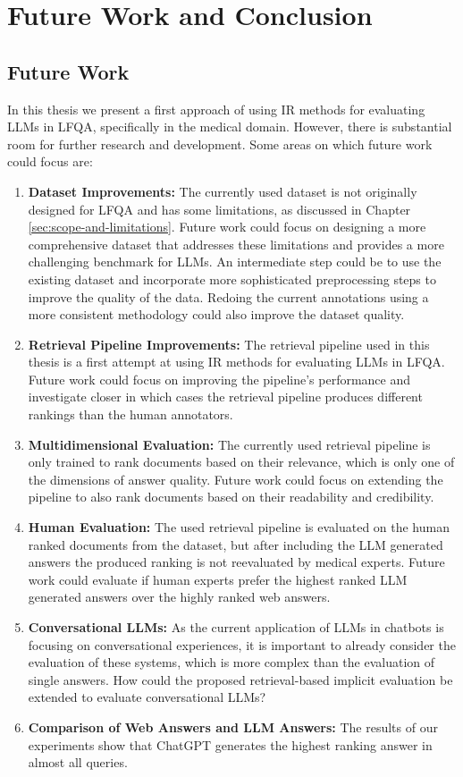 \chapter{Future Work and Conclusion}\label{conclusion}

\section{Future Work}
In this thesis we present a first approach of using IR methods for evaluating LLMs in LFQA, specifically in the medical domain.
However, there is substantial room for further research and development.
Some areas on which future work could focus are:

\begin{enumerate}
    \item \textbf{Dataset Improvements:} The currently used dataset is not originally designed for LFQA and has some limitations, as discussed in Chapter \ref{sec:scope-and-limitations}. Future work could focus on designing a more comprehensive dataset that addresses these limitations and provides a more challenging benchmark for LLMs. An intermediate step could be to use the existing dataset and incorporate more sophisticated preprocessing steps to improve the quality of the data. Redoing the current annotations using a more consistent methodology could also improve the dataset quality.
    \item \textbf{Retrieval Pipeline Improvements:} The retrieval pipeline used in this thesis is a first attempt at using IR methods for evaluating LLMs in LFQA. Future work could focus on improving the pipeline's performance and investigate closer in which cases the retrieval pipeline produces different rankings than the human annotators.
    \item \textbf{Multidimensional Evaluation:} The currently used retrieval pipeline is only trained to rank documents based on their relevance, which is only one of the dimensions of answer quality. Future work could focus on extending the pipeline to also rank documents based on their readability and credibility.
    \item \textbf{Human Evaluation:} The used retrieval pipeline is evaluated on the human ranked documents from the dataset, but after including the LLM generated answers the produced ranking is not reevaluated by medical experts. Future work could evaluate if human experts prefer the highest ranked LLM generated answers over the highly ranked web answers.
    \item \textbf{Conversational LLMs:} As the current application of LLMs in chatbots is focusing on conversational experiences, it is important to already consider the evaluation of these systems, which is more complex than the evaluation of single answers. How could the proposed retrieval-based implicit evaluation be extended to evaluate conversational LLMs?
    \item \textbf{Comparison of Web Answers and LLM Answers:} The results of our experiments show that ChatGPT generates the highest ranking answer in almost all queries. 
\end{enumerate}

